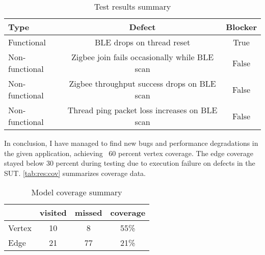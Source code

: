 \begin{table}
    \centering
    \begin{tabular}{ l c c }
        \toprule
        Type           & Defect                                        & Blocker \\
        \midrule
        Functional     & BLE drops on thread reset                     & True    \\
        Non-functional & Zigbee join fails occasionally while BLE scan & False   \\
        Non-functional & Zigbee throughput success drops on BLE scan   & False   \\
        Non-functional & Thread ping packet loss increases on BLE scan & False   \\
        \bottomrule
    \end{tabular}
    \caption{Test results summary}
    \label{tab:res:summary}
\end{table}

In conclusion, I have managed to find new bugs and performance degradations in the given application, achieving ~60 percent vertex coverage. The edge coverage stayed below 30 percent during testing due to execution failure on defects in the SUT. \autoref{tab:res:cov} summarizes coverage data.

\begin{table}
    \centering
    \caption{Model coverage summary}
    \begin{tabular}{l c c c}
        \toprule
               & visited & missed & coverage \\
        \midrule
        Vertex & 10      & 8      & 55\%     \\
        Edge   & 21      & 77     & 21\%\\
        \bottomrule
    \end{tabular}
    \label{tab:res:cov}
\end{table}